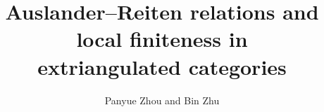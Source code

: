 \documentclass[11pt, twoside]{article}
\numberwithin{equation}{section}
\begin{document}
\baselineskip=15pt

\def\Pcal{\mathcal{P}}
\def\Ical{\mathcal{I}}
\newcommand{\ind}{\operatorname{ind}}
\newcommand{\Supp}{\operatorname{Supp}}
\newcommand{\rad}{\operatorname{rad}}
\newcommand{\AR}{\operatorname{AR}}
\newcommand{\Rel}{\operatorname{Rel}}
\newcommand{\Proj}{\operatorname{Proj}}
\newcommand{\Inj}{\operatorname{Inj}}
\newcommand{\Db}{\mathrm D^{\mathrm b}}
\newcommand{\modcat}{\operatorname{mod}}
\newcommand{\length}{\operatorname{length}}


\title{\Large{\bf Auslander--Reiten relations and local finiteness in\\[2mm] extriangulated categories}}
\medskip
\author{Panyue Zhou and Bin Zhu}
\date{}

\maketitle

\newtheorem{theorem}{Theorem}[section]
\newtheorem{lemma}[theorem]{Lemma}
\newtheorem{corollary}[theorem]{Corollary}
\newtheorem{proposition}[theorem]{Proposition}
\newtheorem{conjecture}{Conjecture}
\theoremstyle{definition}
\newtheorem{definition}[theorem]{Definition}
\newtheorem{question}[theorem]{Question}
\newtheorem{remark}[theorem]{Remark}
\newtheorem{remark*}[]{Remark}
\newtheorem{example}[theorem]{Example}
\newtheorem{example*}[]{Example}
\newtheorem{condition}[theorem]{Condition}
\newtheorem{condition*}[]{Condition}
\newtheorem{construction}[theorem]{Construction}
\newtheorem{construction*}[]{Construction}
\newtheorem{assumption}[theorem]{Assumption}
\newtheorem{assumption*}[]{Assumption}

\baselineskip=17pt
\parindent=0.5cm
\vspace{-6mm}
\end{document}
